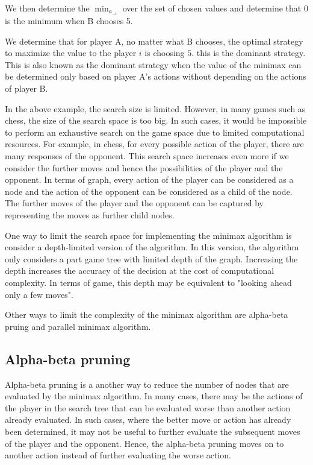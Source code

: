  We then determine the $\min_{a_{-i}}$ over the set of chosen values and determine that $0$ is the minimum when B chooses 5.

 We determine that for player A, no matter what B chooses, the optimal strategy to maximize the value to the player $i$ is choosing $5$. this is the dominant strategy. This is also known as the dominant strategy when the value of the minimax can be determined only based on player A's actions without depending on the actions of player B. 

 In the above example, the search size is limited. However, in many games such as chess, the size of the search space is too big. In such cases, it would be impossible to perform an exhaustive search on the game space due to limited computational resources. For example, in chess, for every possible action of the player, there are many responses of the opponent. This search space increases even more if we consider the further moves and hence the possibilities of the player and the opponent. In terms of graph, every action of the player can be considered as a node and the action of the opponent can be considered as a child of the node. The further moves of the player and the opponent can be captured by representing the moves as further child nodes.

One way to limit the search space for implementing the minimax algorithm is consider a depth-limited version of the algorithm. In this version, the algorithm only considers a part game tree with limited depth of the graph. Increasing the depth increases the accuracy of the decision at the cost of computational complexity. In terms of game, this depth may be equivalent to "looking ahead only a few moves". 

Other ways to limit the complexity of the minimax algorithm are alpha-beta pruing and parallel minimax algorithm.

 
\subsection{Alpha-beta pruning}

Alpha-beta pruning is a another way to reduce the number of nodes that are evaluated by the minimax algorithm. In many cases, there may be the actions of the player in the search tree that can be evaluated worse than another action already evaluated. In such cases, where the better move or action has already been determined, it may not be useful to further evaluate the subsequent moves of the player and the opponent. Hence, the alpha-beta pruning moves on to another action instead of further evaluating the worse action.

